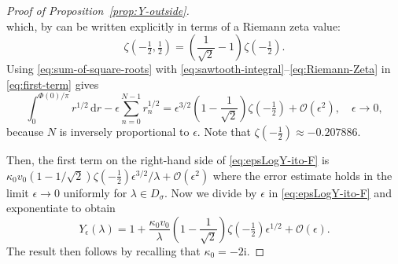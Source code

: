 \documentclass[12pt]{amsart}
\numberwithin{equation}{section}
\newcommand{\dd}{\mathrm{d}}
\newcommand{\ii}{\mathrm{i}}
\newcommand{\SP}{\lambda}
\newcommand{\phaseint}{\Phi}
\newcommand{\rr}{r}
\newcommand{\bigo}[1]{ \mathcal{O}\! \left( #1 \right) }
\begin{document}
\begin{proof}[Proof of Proposition~\ref{prop:Y-outside}]
\begin{equation}
\label{eq:Hurwitz-Zeta}
\end{equation}
which, by \cite[25.11.11]{DLMF} can be written explicitly in terms of a Riemann zeta value:
\begin{equation}
\zeta(-\tfrac{1}{2},\tfrac{1}{2})=\left(\frac{1}{\sqrt{2}}-1\right)\zeta(-\tfrac{1}{2}).
\label{eq:Riemann-Zeta}
\end{equation}
Using \eqref{eq:sum-of-square-roots} with \eqref{eq:sawtooth-integral}--\eqref{eq:Riemann-Zeta} in \eqref{eq:first-term} gives
\begin{equation}
\int_0^{\phaseint(0)/\pi}\rr^{1/2}\,\dd \rr-\epsilon\sum_{n=0}^{N-1}\rr_n^{1/2}=\epsilon^{3/2}\left(1-\frac{1}{\sqrt{2}}\right)\zeta(-\tfrac{1}{2}) +\bigo{\epsilon^2},\quad \epsilon\to 0,
\label{eq:RS-square-root}
\end{equation}
because $N$ is inversely proportional to $\epsilon$.  Note that $\zeta(-\tfrac{1}{2})\approx -0.207886$.

Then, the first term on the right-hand side of \eqref{eq:epsLogY-ito-F} is $\kappa_0v_0(1-1/\sqrt{2})\zeta(-\frac{1}{2})\epsilon^{3/2}/\SP + \bigo{\epsilon^2}$ where the error estimate holds in the limit $\epsilon\to 0$ uniformly for $\SP\in D_\sigma$.  
Now we divide by $\epsilon$ in \eqref{eq:epsLogY-ito-F} and exponentiate to obtain
\[
Y_\epsilon(\SP)=1+\frac{\kappa_0v_0}{\SP}\left(1-\frac{1}{\sqrt{2}}\right)\zeta(-\tfrac{1}{2})\epsilon^{1/2}+\bigo{\epsilon}.
\]
The result then follows by recalling that $\kappa_0=-2\ii$.
\end{proof}

\Yzetasmall*
\end{document}

